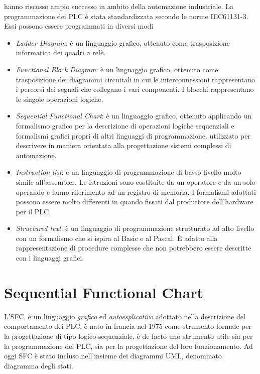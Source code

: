 \documentclass[10pt, letterpaper]{report}
\begin{document}
hanno riscosso ampio successo in ambito della automazione industriale. La programmazione dei PLC è stata standardizzata secondo le norme IEC61131-3. Essi possono essere programmati in diversi modi\begin{itemize}
    \item \textit{Ladder Diagram}: è un linguaggio grafico, ottenuto come trasposizione informatica dei quadri a relè.
    \item \textit{Functional Block Diagram}: è un linguaggio grafico, ottenuto come trasposizione dei diagrammi circuitali in cui le
    interconnessioni rappresentano i percorsi dei segnali che
    collegano i vari componenti. I blocchi rappresentano le singole
    operazioni logiche.
    \item \textit{Sequential Functional Chart}: è un linguaggio grafico, ottenuto applicando un formalismo grafico per la descrizione di
    operazioni logiche sequenziali e formalismi grafici propri di altri
    linguaggi di programmazione. utilizzato per descrivere in maniera
    orientata alla progettazione sistemi complessi di
    automazione.
    \item \textit{Instruction list}: è un linguaggio di programmazione di basso livello molto simile
    all'assembler. Le istruzioni sono costituite da un operatore
    e da un solo operando e fanno riferimento ad un registro di
    memoria. I formalismi adottati possono essere molto differenti
    in quando fissati dal produttore dell'hardware per il PLC.
    \item \textit{Structured text}: è un linguaggio di programmazione strutturato ad alto livello con
    un formalismo che si ispira al Basic e al Pascal. È adatto
    alla rappresentazione di procedure complesse che non
    potrebbero essere descritte con i linguaggi grafici.
\end{itemize}\flowerLine 
\section{Sequential Functional Chart}
L'SFC, è un linguaggio \textit{grafico} ed \textit{autoesplicativo} adottato nella descrizione del comportamento dei PLC, è nato in francia nel 1975 come strumento formale per la progettazione di tipo logico-sequenziale, è de facto uno strumento utile sia per la programmazione dei PLC, sia per la progettazione del loro funzionamento. Ad oggi SFC è stato incluso nell'insieme dei diagrammi UML, denominato diagramma degli stati.
\end{document}
